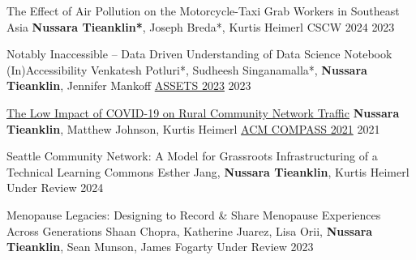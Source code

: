 

\begin{cventries}

\cvpub
    {The Effect of Air Pollution on the Motorcycle-Taxi Grab Workers in Southeast Asia} %
    {\textbf{Nussara Tieanklin*}, Joseph Breda*, Kurtis Heimerl} %
    {CSCW 2024} %
    {2023} %



\cvpub
    {Notably Inaccessible – Data Driven Understanding of Data Science Notebook (In)Accessibility} %
    {Venkatesh Potluri*, Sudheesh Singanamalla*, \textbf{Nussara Tieanklin}, Jennifer Mankoff} %
    {\href{https://dl.acm.org/doi/10.1145/3597638.3608417}{ASSETS 2023}} %
    {2023} %


  \cvpub
    {\href{https://dl.acm.org/doi/10.1145/3460112.3472311}{The Low Impact of COVID-19 on Rural Community Network Traffic}} %
    {\textbf{Nussara Tieanklin}, Matthew Johnson, Kurtis Heimerl}
    {\href{https://dl.acm.org/doi/10.1145/3460112.3472311}{ACM COMPASS 2021}}
    {2021}



\cvpub
    {Seattle Community Network: A Model for Grassroots Infrastructuring of a Technical Learning Commons} %
    {Esther Jang, \textbf{Nussara Tieanklin}, Kurtis Heimerl} %
    {Under Review} %
    {2024} %
   
   

\cvpub
    {Menopause Legacies: Designing to Record \& Share Menopause Experiences Across Generations} %
    {Shaan Chopra, Katherine Juarez, Lisa Orii, \textbf{Nussara Tieanklin}, Sean Munson, James Fogarty} %
    {Under Review} %
    {2023} %
   


\end{cventries}
